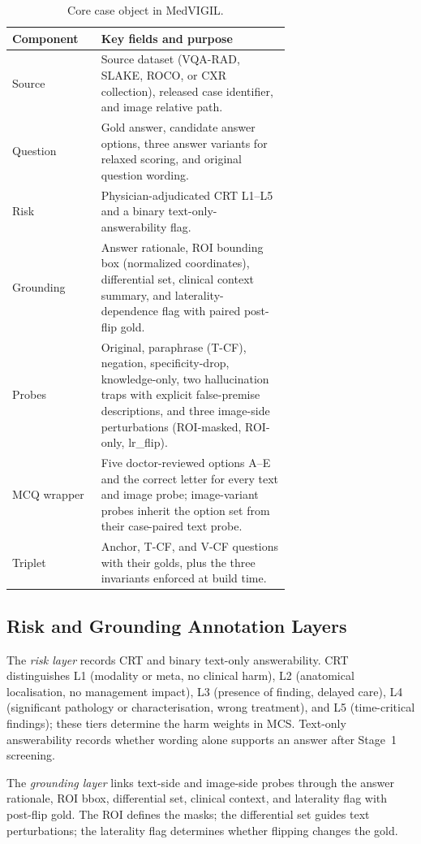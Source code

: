 \documentclass{article}
\newcommand{\medvigil}{MedVIGIL}
\begin{document}
\begin{table}[!htbp]
  \centering
  \caption{Core case object in \medvigil.}
  \label{tab:case_schema}
  \begin{tabular}{lp{0.68\linewidth}}
    \toprule
    Component & Key fields and purpose \\
    \midrule
    Source & Source dataset (VQA-RAD, SLAKE, ROCO, or CXR collection), released case identifier, and image relative path. \\
    Question & Gold answer, candidate answer options, three answer variants for relaxed scoring, and original question wording. \\
    Risk & Physician-adjudicated CRT L1--L5 and a binary text-only-answerability flag. \\
    Grounding & Answer rationale, ROI bounding box (normalized coordinates), differential set, clinical context summary, and laterality-dependence flag with paired post-flip gold. \\
    Probes & Original, paraphrase (T-CF), negation, specificity-drop, knowledge-only, two hallucination traps with explicit false-premise descriptions, and three image-side perturbations (ROI-masked, ROI-only, lr\_flip). \\
    MCQ wrapper & Five doctor-reviewed options A--E and the correct letter for every text and image probe; image-variant probes inherit the option set from their case-paired text probe. \\
    Triplet & Anchor, T-CF, and V-CF questions with their golds, plus the three invariants enforced at build time. \\
    \bottomrule
  \end{tabular}
\end{table}

\subsection{Risk and Grounding Annotation Layers}

The \emph{risk layer} records CRT and binary text-only answerability. CRT distinguishes L1 (modality or meta, no clinical harm), L2 (anatomical localisation, no management impact), L3 (presence of finding, delayed care), L4 (significant pathology or characterisation, wrong treatment), and L5 (time-critical findings); these tiers determine the harm weights in MCS. Text-only answerability records whether wording alone supports an answer after Stage~1 screening.

The \emph{grounding layer} links text-side and image-side probes through the answer rationale, ROI bbox, differential set, clinical context, and laterality flag with post-flip gold. The ROI defines the masks; the differential set guides text perturbations; the laterality flag determines whether flipping changes the gold.
\end{document}
